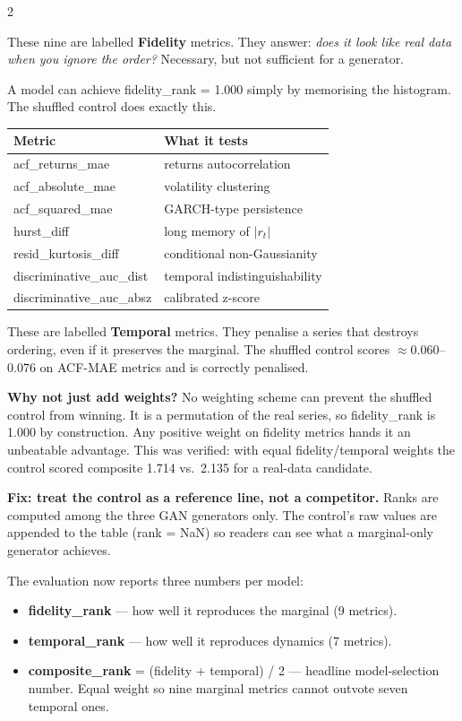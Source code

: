 \documentclass[10pt]{article}
\newcommand{\navybox}[2]{\begin{tcolorbox}[mybox={Navy}{LBg},title={#1}]#2\end{tcolorbox}}
\newcommand{\purplebox}[2]{\begin{tcolorbox}[mybox={Purple}{LBg},title={#1}]#2\end{tcolorbox}}
\begin{document}
\begin{multicols}{2}
{\smallskip
These nine are labelled \textbf{Fidelity} metrics. They answer: \emph{does it look like real data when you ignore the order?} Necessary, but not sufficient for a generator.

\smallskip
A model can achieve fidelity\_rank = 1.000 simply by memorising the histogram. The shuffled control does exactly this.}

\columnbreak

\purplebox{The Seven Ordering-Sensitive (Temporal) Metrics}{%
\begin{tabular}{@{}ll@{}}
\toprule
Metric & What it tests \\
\midrule
acf\_returns\_mae    & returns autocorrelation \\
acf\_absolute\_mae  & volatility clustering \\
acf\_squared\_mae   & GARCH-type persistence \\
hurst\_diff          & long memory of $|r_t|$ \\
resid\_kurtosis\_diff & conditional non-Gaussianity \\
discriminative\_auc\_dist & temporal indistinguishability \\
discriminative\_auc\_absz & calibrated z-score \\
\bottomrule
\end{tabular}

\smallskip
These are labelled \textbf{Temporal} metrics. They penalise a series that destroys ordering, even if it preserves the marginal. The shuffled control scores $\approx 0.060$--$0.076$ on ACF-MAE metrics and is correctly penalised.}

\navybox{The Three-Score Design}{%
\textbf{Why not just add weights?} No weighting scheme can prevent the shuffled control from winning. It is a permutation of the real series, so fidelity\_rank is 1.000 by construction. Any positive weight on fidelity metrics hands it an unbeatable advantage. This was verified: with equal fidelity/temporal weights the control scored composite 1.714 vs.\ 2.135 for a real-data candidate.

\smallskip
\textbf{Fix: treat the control as a reference line, not a competitor.} Ranks are computed among the three GAN generators only. The control's raw values are appended to the table (rank = NaN) so readers can see what a marginal-only generator achieves.

\smallskip
The evaluation now reports three numbers per model:
\begin{itemize}
  \item \textbf{fidelity\_rank} --- how well it reproduces the marginal (9 metrics).
  \item \textbf{temporal\_rank} --- how well it reproduces dynamics (7 metrics).
  \item \textbf{composite\_rank} = (fidelity + temporal) / 2 --- headline model-selection number. Equal weight so nine marginal metrics cannot outvote seven temporal ones.
\end{itemize}

}
\end{multicols}
\end{document}
